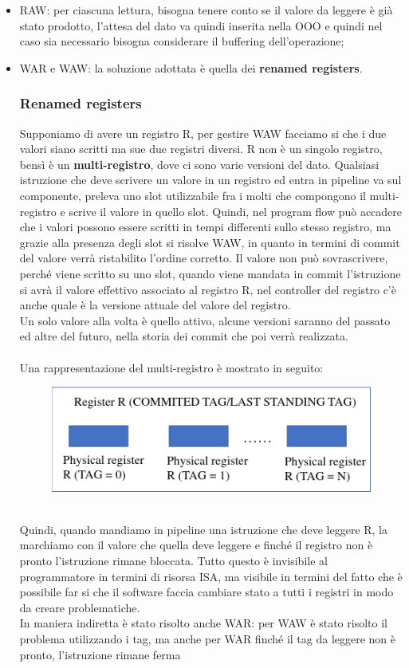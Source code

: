 \documentclass[12pt, oneside]{extbook}
\begin{document}
\begin{itemize}
\item RAW: per ciascuna lettura, bisogna tenere conto se il valore da leggere è già stato prodotto, l'attesa del dato va quindi inserita nella OOO e quindi nel caso sia necessario bisogna considerare il buffering dell'operazione;
\item WAR e WAW: la soluzione adottata è quella dei \textbf{renamed registers}. 
\subsubsection{Renamed registers}
Supponiamo di avere un registro R, per gestire WAW facciamo si che i due valori siano scritti ma sue due registri diversi. R non è un singolo registro, bensì è un \textbf{multi-registro}, dove ci sono varie versioni del dato. Qualsiasi istruzione che deve scrivere un valore in un registro ed entra in pipeline va sul componente, preleva uno slot utilizzabile fra i molti che compongono il multi-registro e scrive il valore in quello slot. Quindi, nel program flow può accadere che i valori possono essere scritti in tempi differenti sullo stesso registro, ma grazie alla presenza degli slot si risolve WAW, in quanto in termini di commit del valore verrà ristabilito l'ordine corretto. Il valore non può sovrascrivere, perché viene scritto su uno slot, quando viene mandata in commit l'istruzione si avrà il valore effettivo associato al registro R, nel controller del registro c'è anche quale è la versione attuale del valore del registro.\\ Un solo valore alla volta è quello attivo, alcune versioni saranno del passato ed altre del futuro, nella storia dei commit che poi verrà realizzata.\\\\Una rappresentazione del multi-registro è mostrato in seguito:
\begin{figure}[!h]
	\includegraphics[scale=0.25]{immagini/multi-registri}
\end{figure}
\\Quindi, quando mandiamo in pipeline una istruzione che deve leggere R, la marchiamo con il valore che quella deve leggere e finché il registro non è pronto l'istruzione rimane bloccata. Tutto questo è invisibile al programmatore in termini di risorsa ISA, ma visibile in termini del fatto che è possibile far si che il software faccia cambiare stato a tutti i registri in modo da creare problematiche.\\ In maniera indiretta è stato risolto anche WAR: per WAW è stato risolto il problema utilizzando i tag, ma anche per WAR finché il tag da leggere non è pronto, l'istruzione rimane ferma
\end{itemize}
\end{document}
